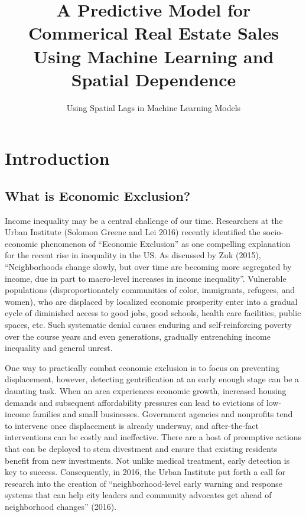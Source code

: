 \documentclass[]{article}
\title{A Predictive Model for Commerical Real Estate Sales Using Machine
Learning and Spatial Dependence}
\subtitle{Using Spatial Lags in Machine Learning Models}
\author{}
\date{}
\begin{document}
\maketitle

{
\setcounter{tocdepth}{2}
\tableofcontents
}
\section{Introduction}\label{introduction}

\subsection{What is Economic
Exclusion?}\label{what-is-economic-exclusion}

Income inequality may be a central challenge of our time. Researchers at
the Urban Institute (Solomon Greene and Lei 2016) recently identified
the socio-economic phenomenon of ``Economic Exclusion'' as one
compelling explanation for the recent rise in inequality in the US. As
discussed by Zuk (2015), ``Neighborhoods change slowly, but over time
are becoming more segregated by income, due in part to macro-level
increases in income inequality''. Vulnerable populations
(disproportionately communities of color, immigrants, refugees, and
women), who are displaced by localized economic prosperity enter into a
gradual cycle of diminished access to good jobs, good schools, health
care facilities, public spaces, etc. Such systematic denial causes
enduring and self-reinforcing poverty over the course years and even
generations, gradually entrenching income inequality and general unrest.

One way to practically combat economic exclusion is to focus on
preventing displacement, however, detecting gentrification at an early
enough stage can be a daunting task. When an area experiences economic
growth, increased housing demands and subsequent affordability pressures
can lead to evictions of low-income families and small businesses.
Government agencies and nonprofits tend to intervene once displacement
is already underway, and after-the-fact interventions can be costly and
ineffective. There are a host of preemptive actions that can be deployed
to stem divestment and ensure that existing residents benefit from new
investments. Not unlike medical treatment, early detection is key to
success. Consequently, in 2016, the Urban Institute put forth a call for
research into the creation of ``neighborhood-level early warning and
response systems that can help city leaders and community advocates get
ahead of neighborhood changes'' (2016).
\end{document}
